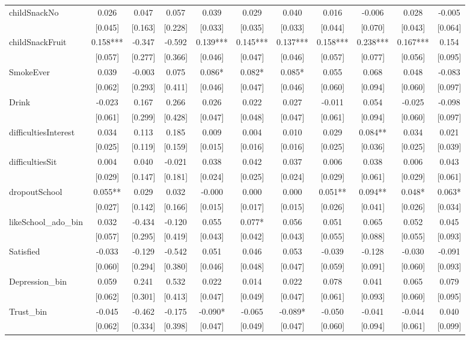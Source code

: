 \documentclass[12pt]{article}
\begin{document}
\begin{table}[ht]
\begin{center}
\begin{adjustbox}{width=1.2\textwidth,center=\textwidth}
\begin{tabular}{l*{10}{c}}
childSnackNo & 0.026 & 0.047 & 0.057 & 0.039 & 0.029 & 0.040 & 0.016 & -0.006 & 0.028 & -0.005 \\
 & [0.045] & [0.163] & [0.228] & [0.033] & [0.035] & [0.033] & [0.044] & [0.070] & [0.043] & [0.064] \\
childSnackFruit & 0.158*** & -0.347 & -0.592 & 0.139*** & 0.145*** & 0.137*** & 0.158*** & 0.238*** & 0.167*** & 0.154 \\
 & [0.057] & [0.277] & [0.366] & [0.046] & [0.047] & [0.046] & [0.057] & [0.077] & [0.056] & [0.095] \\
SmokeEver & 0.039 & -0.003 & 0.075 & 0.086* & 0.082* & 0.085* & 0.055 & 0.068 & 0.048 & -0.083 \\
 & [0.062] & [0.293] & [0.411] & [0.046] & [0.047] & [0.046] & [0.060] & [0.094] & [0.060] & [0.097] \\
Drink & -0.023 & 0.167 & 0.266 & 0.026 & 0.022 & 0.027 & -0.011 & 0.054 & -0.025 & -0.098 \\
 & [0.061] & [0.299] & [0.428] & [0.047] & [0.048] & [0.047] & [0.061] & [0.094] & [0.060] & [0.097] \\
difficultiesInterest & 0.034 & 0.113 & 0.185 & 0.009 & 0.004 & 0.010 & 0.029 & 0.084** & 0.034 & 0.021 \\
 & [0.025] & [0.119] & [0.159] & [0.015] & [0.016] & [0.016] & [0.025] & [0.036] & [0.025] & [0.039] \\
difficultiesSit & 0.004 & 0.040 & -0.021 & 0.038 & 0.042 & 0.037 & 0.006 & 0.038 & 0.006 & 0.043 \\
 & [0.029] & [0.147] & [0.181] & [0.024] & [0.025] & [0.024] & [0.029] & [0.061] & [0.029] & [0.061] \\
dropoutSchool & 0.055** & 0.029 & 0.032 & -0.000 & 0.000 & 0.000 & 0.051** & 0.094** & 0.048* & 0.063* \\
 & [0.027] & [0.142] & [0.166] & [0.015] & [0.017] & [0.015] & [0.026] & [0.041] & [0.026] & [0.034] \\
likeSchool\_ado\_bin & 0.032 & -0.434 & -0.120 & 0.055 & 0.077* & 0.056 & 0.051 & 0.065 & 0.052 & 0.045 \\
 & [0.057] & [0.295] & [0.419] & [0.043] & [0.042] & [0.043] & [0.055] & [0.088] & [0.055] & [0.093] \\
Satisfied & -0.033 & -0.129 & -0.542 & 0.051 & 0.046 & 0.053 & -0.039 & -0.128 & -0.030 & -0.091 \\
 & [0.060] & [0.294] & [0.380] & [0.046] & [0.048] & [0.047] & [0.059] & [0.091] & [0.060] & [0.093] \\
Depression\_bin & 0.059 & 0.241 & 0.532 & 0.022 & 0.014 & 0.022 & 0.078 & 0.041 & 0.065 & 0.079 \\
 & [0.062] & [0.301] & [0.413] & [0.047] & [0.049] & [0.047] & [0.061] & [0.093] & [0.060] & [0.095] \\
Trust\_bin & -0.045 & -0.462 & -0.175 & -0.090* & -0.065 & -0.089* & -0.050 & -0.041 & -0.044 & 0.040 \\
 & [0.062] & [0.334] & [0.398] & [0.047] & [0.049] & [0.047] & [0.060] & [0.094] & [0.061] & [0.099] \\


\end{tabular}
\end{adjustbox}
\end{center}
\end{table}
\end{document}
